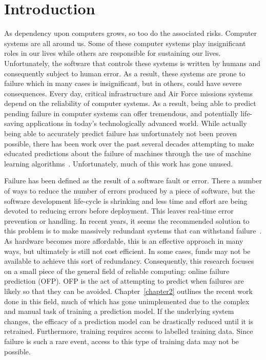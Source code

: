 \chapter{Introduction} \label{chapter1}
As dependency upon computers grows, so too do the associated risks.  Computer
systems are all around us.  Some of these computer systems play insignificant
roles in our lives while others are responsible for sustaining our lives.
Unfortunately, the software that controls these systems is written by humans
and consequently subject to human error.  As a result, these systems are prone
to failure which in many cases is insignificant, but in others, could have
severe consequences.  Every day, critical infrastructure and Air Force missions
systems depend on the reliability of computer systems.  As a result, being able
to predict pending failure in computer systems can offer tremendous, and
potentially life-saving applications in today's technologically advanced world.
While actually being able to accurately predict failure has unfortunately not
been proven possible, there has been work over the past several decades
attempting to make educated predictions about the failure of machines through
the use of machine learning algorithms~\cite{salfnerSurvey}.  Unfortunately,
much of this work has gone unused.  

Failure has been defined as the result of a software fault or error.  There a
number of ways to reduce the number of errors produced by a piece of software,
but the software development life-cycle is shrinking and less time and effort
are being devoted to reducing errors before deployment.  This leaves real-time
error prevention or handling.  In recent years, it seems the recommended
solution to this problem is to make massively redundant systems that can
withstand failure~\cite{bauer2012}.  As hardware becomes more affordable, this
is an effective approach in many ways, but ultimately is still not cost
efficient.  In some cases, funds may not be available to achieve this sort of
redundancy.  Consequently, this research focuses on a small piece of the
general field of reliable computing: online failure prediction (OFP).  OFP is
the act of attempting to predict when failures are likely so that they can be
avoided.  Chapter~\ref{chapter2} outlines the recent work done in this field,
much of which has gone unimplemented due to the complex and manual task of
training a prediction model.  If the underlying system changes, the efficacy of
a prediction model can be drastically reduced until it is retrained.
Furthermore, training requires access to labelled training data.  Since failure
is such a rare event, access to this type of training data may not be possible.  

